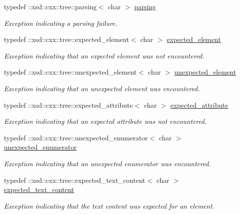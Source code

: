 \begin{DoxyCompactItemize}
typedef \+::xsd\+::cxx\+::tree\+::parsing$<$ char $>$ \hyperlink{namespacexml__schema_a150f88d7d2156ae81807b142038684f5}{parsing}
\begin{DoxyCompactList}\small\item\em Exception indicating a parsing failure. \end{DoxyCompactList}\item 
typedef \+::xsd\+::cxx\+::tree\+::expected\+\_\+element$<$ char $>$ \hyperlink{namespacexml__schema_a4b608c951db27c574552da0bda062e1a}{expected\+\_\+element}
\begin{DoxyCompactList}\small\item\em Exception indicating that an expected element was not encountered. \end{DoxyCompactList}\item 
typedef \+::xsd\+::cxx\+::tree\+::unexpected\+\_\+element$<$ char $>$ \hyperlink{namespacexml__schema_a55835ab195e4c70bc05de5bbac871110}{unexpected\+\_\+element}
\begin{DoxyCompactList}\small\item\em Exception indicating that an unexpected element was encountered. \end{DoxyCompactList}\item 
typedef \+::xsd\+::cxx\+::tree\+::expected\+\_\+attribute$<$ char $>$ \hyperlink{namespacexml__schema_ad8a9d3a09372da61ab6ba78c4de87a26}{expected\+\_\+attribute}
\begin{DoxyCompactList}\small\item\em Exception indicating that an expected attribute was not encountered. \end{DoxyCompactList}\item 
typedef \+::xsd\+::cxx\+::tree\+::unexpected\+\_\+enumerator$<$ char $>$ \hyperlink{namespacexml__schema_aa088274f605e06cd53d9062265b5229c}{unexpected\+\_\+enumerator}
\begin{DoxyCompactList}\small\item\em Exception indicating that an unexpected enumerator was encountered. \end{DoxyCompactList}\item 
typedef \+::xsd\+::cxx\+::tree\+::expected\+\_\+text\+\_\+content$<$ char $>$ \hyperlink{namespacexml__schema_a1994323b3f5fee8db7891f02bb9144b9}{expected\+\_\+text\+\_\+content}
\begin{DoxyCompactList}\small\item\em Exception indicating that the text content was expected for an element. \end{DoxyCompactList}\item 

\end{DoxyCompactItemize}
